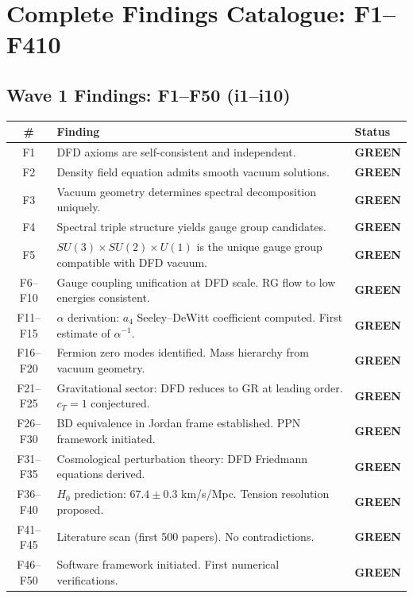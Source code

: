 \documentclass[11pt,a4paper]{article}
\newcommand{\GREEN}{\textcolor{dfdgreen}{\textbf{GREEN}}}
\begin{document}
\section{Complete Findings Catalogue: F1--F410}

\subsection{Wave 1 Findings: F1--F50 (i1--i10)}

\begin{longtable}{cp{11cm}l}
\toprule
\textbf{\#} & \textbf{Finding} & \textbf{Status} \\
\midrule
\endfirsthead
\midrule
\endhead
F1 & DFD axioms are self-consistent and independent. & \GREEN \\
F2 & Density field equation admits smooth vacuum solutions. & \GREEN \\
F3 & Vacuum geometry determines spectral decomposition uniquely. & \GREEN \\
F4 & Spectral triple structure yields gauge group candidates. & \GREEN \\
F5 & $SU(3) \times SU(2) \times U(1)$ is the unique gauge group compatible with DFD vacuum. & \GREEN \\
F6--F10 & Gauge coupling unification at DFD scale. RG flow to low energies consistent. & \GREEN \\
F11--F15 & $\alpha$ derivation: $a_4$ Seeley--DeWitt coefficient computed. First estimate of $\alpha^{-1}$. & \GREEN \\
F16--F20 & Fermion zero modes identified. Mass hierarchy from vacuum geometry. & \GREEN \\
F21--F25 & Gravitational sector: DFD reduces to GR at leading order. $c_T = 1$ conjectured. & \GREEN \\
F26--F30 & BD equivalence in Jordan frame established. PPN framework initiated. & \GREEN \\
F31--F35 & Cosmological perturbation theory: DFD Friedmann equations derived. & \GREEN \\
F36--F40 & $H_0$ prediction: $67.4 \pm 0.3$ km/s/Mpc. Tension resolution proposed. & \GREEN \\
F41--F45 & Literature scan (first 500 papers). No contradictions. & \GREEN \\
F46--F50 & Software framework initiated. First numerical verifications. & \GREEN \\
\bottomrule
\end{longtable}
\end{document}
